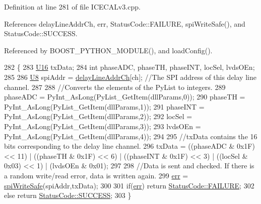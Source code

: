 Definition at line 281 of file I\+C\+E\+C\+A\+Lv3.\+cpp.



References delay\+Line\+Addr\+Ch, err, Status\+Code\+::\+F\+A\+I\+L\+U\+RE, spi\+Write\+Safe(), and Status\+Code\+::\+S\+U\+C\+C\+E\+SS.



Referenced by B\+O\+O\+S\+T\+\_\+\+P\+Y\+T\+H\+O\+N\+\_\+\+M\+O\+D\+U\+L\+E(), and load\+Config().


\begin{DoxyCode}
282 \{                            
283     \hyperlink{ICECALv3_8h_adf928e51a60dba0df29d615401cc55a8}{U16} txData;
284     \textcolor{keywordtype}{int} phaseADC, phaseTH, phaseINT, locSel, lvdsOEn;
285 
286     \hyperlink{ICECALv3_8h_a3cb25ca6f51f003950f9625ff05536fc}{U8} spiAddr = \hyperlink{ICECALv3_8h_a848408b773702d268053cb49d205e097}{delayLineAddrCh}[ch];          \textcolor{comment}{//The SPI address of this delay line
       channel.}
287 
288     \textcolor{comment}{//Converts the elements of the PyList to integers.}
289     phaseADC = PyInt\_AsLong(PyList\_GetItem(dllParams,0));
290     phaseTH  = PyInt\_AsLong(PyList\_GetItem(dllParams,1));
291     phaseINT = PyInt\_AsLong(PyList\_GetItem(dllParams,2));
292     locSel   = PyInt\_AsLong(PyList\_GetItem(dllParams,3));
293     lvdsOEn  = PyInt\_AsLong(PyList\_GetItem(dllParams,4));
294 
295     \textcolor{comment}{//txData contains the 16 bits corresponding to the delay line channel.}
296     txData =  ((phaseADC & 0x1F) << 11) | ((phaseTH & 0x1F) << 6) | ((phaseINT & 0x1F) << 3) | ((locSel & 
      0x03) << 1) | (lvdsOEn & 0x01);
297 
298     \textcolor{comment}{//Data is sent and checked. If there is a random write/read error, data is written again.}
299     \hyperlink{classICECALv3_ad8989925ee5b3ff322d863ce6aaff0bd}{err} = \hyperlink{classICECALv3_aa0b8358ea0be8e47a8aded5e1551787f}{spiWriteSafe}(spiAddr,txData);  
300 
301     \textcolor{keywordflow}{if}(\hyperlink{classICECALv3_ad8989925ee5b3ff322d863ce6aaff0bd}{err}) \textcolor{keywordflow}{return} \hyperlink{classStatusCode_a6f565cbeadc76d14c72f047e5e85eb4ba3da73d4c469762eb9d3c960368252b26}{StatusCode::FAILURE};
302     \textcolor{keywordflow}{else}        \textcolor{keywordflow}{return} \hyperlink{classStatusCode_a6f565cbeadc76d14c72f047e5e85eb4badd0da38d3ba0d922efd1f4619bc37ad8}{StatusCode::SUCCESS};
303 \}
\end{DoxyCode}
\mbox{\label{classICECALv3_a479f7e17669da4b785af840049d39cb4}} 
